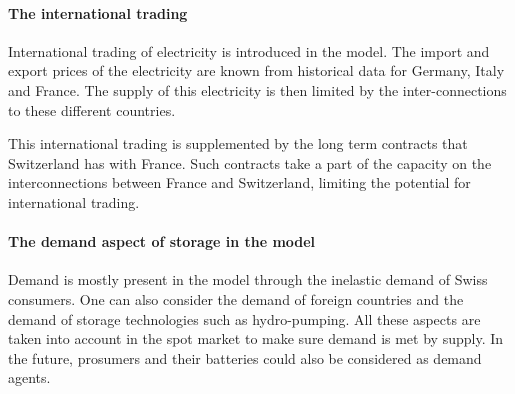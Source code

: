 \paragraph{The international trading}

International trading of electricity is introduced in the model. The import and export prices of the electricity are known from historical data for Germany, Italy and France. The supply of this electricity is then limited by the inter-connections to these different countries.

This international trading is supplemented by the long term contracts that Switzerland has with France. Such contracts take a part of the capacity on the interconnections between France and Switzerland, limiting the potential for international trading. 

\paragraph{The demand aspect of storage in the model} 

Demand is mostly present in the model through the inelastic demand of Swiss consumers. One can also consider the demand of foreign countries and the demand of storage technologies such as hydro-pumping. All these aspects are taken into account in the spot market to make sure demand is met by supply. In the future, prosumers and their batteries could also be considered as demand agents. 

